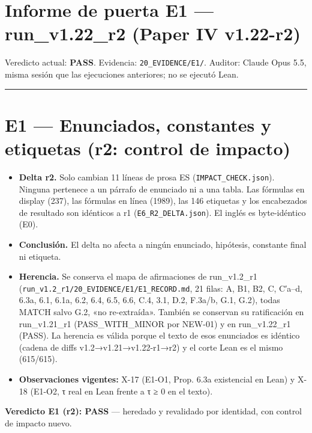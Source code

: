 \documentclass[
]{article}
\author{}
\date{}
\providecommand{\tightlist}{%
  \setlength{\itemsep}{0pt}\setlength{\parskip}{0pt}}
\begin{document}
\section{Informe de puerta E1 --- run\_v1.22\_r2 (Paper IV
v1.22-r2)}\label{informe-de-puerta-e1--run_v122_r2-paper-iv-v122-r2}

Veredicto actual: \textbf{PASS}. Evidencia: \texttt{20\_EVIDENCE/E1/}.
Auditor: Claude Opus 5.5, misma sesión que las ejecuciones anteriores;
no se ejecutó Lean.

\begin{center}\rule{0.5\linewidth}{0.5pt}\end{center}

\section{E1 --- Enunciados, constantes y etiquetas (r2: control de
impacto)}\label{e1--enunciados-constantes-y-etiquetas-r2-control-de-impacto}

\begin{itemize}
\tightlist
\item
  \textbf{Delta r2.} Solo cambian 11 líneas de prosa ES
  (\texttt{IMPACT\_CHECK.json}). Ninguna pertenece a un párrafo de
  enunciado ni a una tabla. Las fórmulas en display (237), las fórmulas
  en línea (1989), las 146 etiquetas y los encabezados de resultado son
  idénticos a r1 (\texttt{E6\_R2\_DELTA.json}). El inglés es
  byte-idéntico (E0).
\item
  \textbf{Conclusión.} El delta no afecta a ningún enunciado, hipótesis,
  constante final ni etiqueta.
\item
  \textbf{Herencia.} Se conserva el mapa de afirmaciones de
  run\_v1.2\_r1 (\texttt{run\_v1.2\_r1/20\_EVIDENCE/E1/E1\_RECORD.md},
  21 filas: A, B1, B2, C, C′a--d, 6.3a, 6.1, 6.1a, 6.2, 6.4, 6.5, 6.6,
  C.4, 3.1, D.2, F.3a/b, G.1, G.2), todas MATCH salvo G.2, «no
  re-extraída». También se conservan su ratificación en run\_v1.21\_r1
  (PASS\_WITH\_MINOR por NEW-01) y en run\_v1.22\_r1 (PASS). La herencia
  es válida porque el texto de esos enunciados es idéntico (cadena de
  diffs v1.2→v1.21→v1.22-r1→r2) y el corte Lean es el mismo (615/615).
\item
  \textbf{Observaciones vigentes:} X-17 (E1-O1, Prop. 6.3a existencial
  en Lean) y X-18 (E1-O2, τ real en Lean frente a τ ≥ 0 en el texto).
\end{itemize}

\textbf{Veredicto E1 (r2): PASS} --- heredado y revalidado por
identidad, con control de impacto nuevo.
\end{document}

